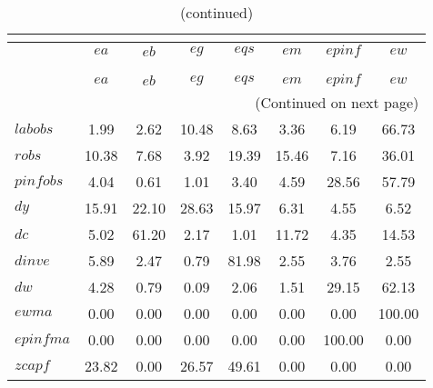  
\begin{center}
\begin{longtable}{lccccccc} 
\caption{VARIANCE DECOMPOSITION (in percent)}\\
 \label{Table:th_var_decomp_uncond}\\
\toprule 
$         $	 & 	 $        ea$	 & 	 $        eb$	 & 	 $        eg$	 & 	 $       eqs$	 & 	 $        em$	 & 	 $     epinf$	 & 	 $        ew$\\
\midrule \endfirsthead 
\caption{(continued)}\\
 \toprule \\ 
$         $	 & 	 $        ea$	 & 	 $        eb$	 & 	 $        eg$	 & 	 $       eqs$	 & 	 $        em$	 & 	 $     epinf$	 & 	 $        ew$\\
\midrule \endhead 
\midrule \multicolumn{8}{r}{(Continued on next page)} \\ \bottomrule \endfoot 
\bottomrule \endlastfoot 
$labobs   $	 & 	      1.99	 & 	      2.62	 & 	     10.48	 & 	      8.63	 & 	      3.36	 & 	      6.19	 & 	     66.73 \\ 
$robs     $	 & 	     10.38	 & 	      7.68	 & 	      3.92	 & 	     19.39	 & 	     15.46	 & 	      7.16	 & 	     36.01 \\ 
$pinfobs  $	 & 	      4.04	 & 	      0.61	 & 	      1.01	 & 	      3.40	 & 	      4.59	 & 	     28.56	 & 	     57.79 \\ 
$dy       $	 & 	     15.91	 & 	     22.10	 & 	     28.63	 & 	     15.97	 & 	      6.31	 & 	      4.55	 & 	      6.52 \\ 
$dc       $	 & 	      5.02	 & 	     61.20	 & 	      2.17	 & 	      1.01	 & 	     11.72	 & 	      4.35	 & 	     14.53 \\ 
$dinve    $	 & 	      5.89	 & 	      2.47	 & 	      0.79	 & 	     81.98	 & 	      2.55	 & 	      3.76	 & 	      2.55 \\ 
$dw       $	 & 	      4.28	 & 	      0.79	 & 	      0.09	 & 	      2.06	 & 	      1.51	 & 	     29.15	 & 	     62.13 \\ 
$ewma     $	 & 	      0.00	 & 	      0.00	 & 	      0.00	 & 	      0.00	 & 	      0.00	 & 	      0.00	 & 	    100.00 \\ 
$epinfma  $	 & 	      0.00	 & 	      0.00	 & 	      0.00	 & 	      0.00	 & 	      0.00	 & 	    100.00	 & 	      0.00 \\ 
$zcapf    $	 & 	     23.82	 & 	      0.00	 & 	     26.57	 & 	     49.61	 & 	      0.00	 & 	      0.00	 & 	      0.00 \\ 

\end{longtable}
\end{center}

